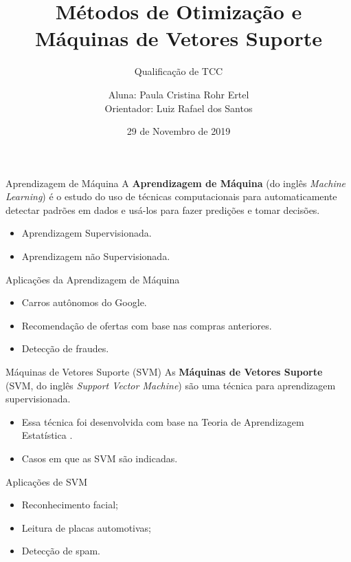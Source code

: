 \documentclass{beamer}
\title[Métodos de Otimização e SVM]{Métodos de Otimização e Máquinas de Vetores Suporte}
\subtitle{Qualificação de TCC}
\author[Paula Ertel]{Aluna: Paula Cristina Rohr Ertel \\ Orientador: Luiz Rafael dos Santos}
\institute[UFSC]{Universidade Federal de Santa Catarina - Campus Blumenau}
\date{29 de Novembro de 2019}
\theoremstyle{definition}%
\begin{document}
\begin{frame}
	\maketitle
\end{frame}


\begin{frame}{Aprendizagem de Máquina}
A \textbf{Aprendizagem de Máquina} (do inglês \textit{Machine Learning}) é o estudo do uso de técnicas computacionais para automaticamente detectar padrões em dados e usá-los para fazer predições e tomar decisões.
	\begin{itemize}
		\item Aprendizagem Supervisionada.
		\item Aprendizagem não Supervisionada.	
	\end{itemize}
\begin{block}{Aplicações da Aprendizagem de Máquina}
	\begin{itemize} %
		\item Carros autônomos do Google.
		\item Recomendação de ofertas com base nas compras anteriores.
		\item Detecção de fraudes.
	\end{itemize}
\end{block}
\end{frame}


\begin{frame}{Máquinas de Vetores Suporte (SVM)}
 As \textbf{Máquinas de Vetores Suporte} (SVM, do inglês \textit{Support Vector Machine}) são uma técnica para aprendizagem supervisionada.
 \begin{itemize}

	\item Essa técnica foi desenvolvida com base na Teoria de Aprendizagem Estatística \cite{Evelin2017} . 

	\item Casos em que as SVM são indicadas.
\end{itemize}
\begin{block}{Aplicações de SVM}
	\begin{itemize}
	\item Reconhecimento facial; 
	\item Leitura de placas automotivas; 
	\item Detecção de spam.
	\end{itemize}
\end{block}
\end{frame}
\end{document}
